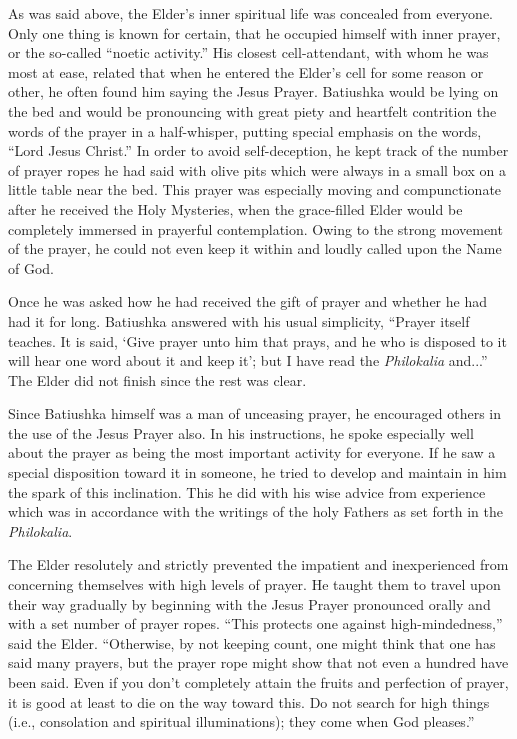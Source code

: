 As was said above, the Elder's inner spiritual life was concealed from everyone. Only one thing is known for certain, that he occupied himself with inner prayer, or the so-called ``noetic activity.'' His closest cell-attendant, with whom he was most at ease, related that when he entered the Elder's cell for some reason or other, he often found him saying the Jesus Prayer. Batiushka would be lying on the bed and would be pronouncing with great piety and heartfelt contrition the words of the prayer in a half-whisper, putting special emphasis on the words, ``Lord Jesus Christ.'' In order to avoid self-deception, he kept track of the number of prayer ropes he had said with olive pits which were always in a small box on a little table near the bed. This prayer was especially moving and compunctionate after he received the Holy Mysteries, when the grace-filled Elder would be completely immersed in prayerful contemplation. Owing to the strong movement of the prayer, he could not even keep it within and loudly called upon the Name of God.

Once he was asked how he had received the gift of prayer and whether he had had it for long. Batiushka answered with his usual simplicity, ``Prayer itself teaches. It is said, `Give prayer unto him that prays, and he who is disposed to it will hear one word about it and keep it'; but I have read the \textit{Philokalia} and...'' The Elder did not finish since the rest was clear.

Since Batiushka himself was a man of unceasing prayer, he encouraged others in the use of the Jesus Prayer also. In his instructions, he spoke especially well about the prayer as being the most important activity for everyone. If he saw a special disposition toward it in someone, he tried to develop and maintain in him the spark of this inclination. This he did with his wise advice from experience which was in accordance with the writings of the holy Fathers as set forth in the \textit{Philokalia}.

The Elder resolutely and strictly prevented the impatient and inexperienced from concerning themselves with high levels of prayer. He taught them to travel upon their way gradually by beginning with the Jesus Prayer pronounced orally and with a set number of prayer ropes. ``This protects one against high-mindedness,'' said the Elder. ``Otherwise, by not keeping count, one might think that one has said many prayers, but the prayer rope might show that not even a hundred have been said. Even if you don't completely attain the fruits and perfection of prayer, it is good at least to die on the way toward this. Do not search for high things (i.e., consolation and spiritual illuminations); they come when God pleases.''


